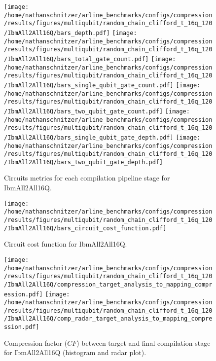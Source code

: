 \documentclass{report}%
\begin{document}
\begin{figure}[h!]%
\centering%
\texttt{[image: /home/nathanschnitzer/arline\_benchmarks/configs/compression/results/figures/multiqubit/random\_chain\_clifford\_t\_16q\_120/IbmAll2All16Q/bars\_depth.pdf]}%
\centering%
\texttt{[image: /home/nathanschnitzer/arline\_benchmarks/configs/compression/results/figures/multiqubit/random\_chain\_clifford\_t\_16q\_120/IbmAll2All16Q/bars\_total\_gate\_count.pdf]}%
\linebreak%
\centering%
\texttt{[image: /home/nathanschnitzer/arline\_benchmarks/configs/compression/results/figures/multiqubit/random\_chain\_clifford\_t\_16q\_120/IbmAll2All16Q/bars\_single\_qubit\_gate\_count.pdf]}%
\centering%
\texttt{[image: /home/nathanschnitzer/arline\_benchmarks/configs/compression/results/figures/multiqubit/random\_chain\_clifford\_t\_16q\_120/IbmAll2All16Q/bars\_two\_qubit\_gate\_count.pdf]}%
\linebreak%
\centering%
\texttt{[image: /home/nathanschnitzer/arline\_benchmarks/configs/compression/results/figures/multiqubit/random\_chain\_clifford\_t\_16q\_120/IbmAll2All16Q/bars\_single\_qubit\_gate\_depth.pdf]}%
\centering%
\texttt{[image: /home/nathanschnitzer/arline\_benchmarks/configs/compression/results/figures/multiqubit/random\_chain\_clifford\_t\_16q\_120/IbmAll2All16Q/bars\_two\_qubit\_gate\_depth.pdf]}%
\linebreak%
\caption{Circuits metrics for each compilation pipeline stage for IbmAll2All16Q.}%
\end{figure}

%


\begin{figure}[h!]%
\centering%
\texttt{[image: /home/nathanschnitzer/arline\_benchmarks/configs/compression/results/figures/multiqubit/random\_chain\_clifford\_t\_16q\_120/IbmAll2All16Q/bars\_circuit\_cost\_function.pdf]}%
\caption{Circuit cost function for IbmAll2All16Q.}%
\end{figure}

%


\begin{figure}[h!]%
\centering%
\texttt{[image: /home/nathanschnitzer/arline\_benchmarks/configs/compression/results/figures/multiqubit/random\_chain\_clifford\_t\_16q\_120/IbmAll2All16Q/compression\_target\_analysis\_to\_mapping\_compression.pdf]}%
\centering%
\texttt{[image: /home/nathanschnitzer/arline\_benchmarks/configs/compression/results/figures/multiqubit/random\_chain\_clifford\_t\_16q\_120/IbmAll2All16Q/comp\_radar\_target\_analysis\_to\_mapping\_compression.pdf]}%
\caption{Compression factor ($CF$) between target and final compilation stage for IbmAll2All16Q
                        (histogram and radar plot).
                        }%
\end{figure}
\end{document}
